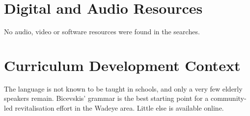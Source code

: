 \documentclass[12pt]{article}
\begin{document}
\section{Digital and Audio Resources}
No audio, video or software resources were found in the searches.

\section{Curriculum Development Context}
The language is not known to be taught in schools, and only a very few elderly speakers remain. Bicevskis' grammar is the best starting point for a community-led revitalisation effort in the Wadeye area. Little else is available online.
\end{document}
